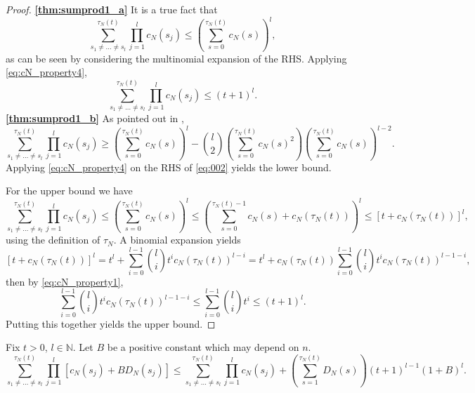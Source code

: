 \begin{proof} \textbf{\ref{thm:sumprod1_a}}
It is a true fact that
\begin{equation*}
\sum_{s_1\neq\dots\neq s_l}^{\tau_N(t)} \prod_{j=1}^l c_N(s_j)
\leq \left( \sum_{s=0}^{\tau_N(t)} c_N(s) \right)^l ,
\end{equation*}
as can be seen by considering the multinomial expansion of the RHS.
Applying \eqref{eq:cN_property4},
\begin{equation}\label{eq:039}
\sum_{s_1\neq\dots\neq s_l}^{\tau_N(t)} \prod_{j=1}^l c_N(s_j)
\leq (t+1)^l .
\end{equation}
\textbf{\ref{thm:sumprod1_b}}
As pointed out in \textcite[Equation (8)]{koskela2018}, 
\begin{equation}\label{eq:002}
\sum_{s_1\neq\dots\neq s_l}^{\tau_N(t)} \prod_{j=1}^l c_N(s_j)
\geq \left( \sum_{s=0}^{\tau_N(t)} c_N(s) \right)^l
        - \binom{l}{2} \left( \sum_{s=0}^{\tau_N(t)} c_N(s)^2 \right)
        \left( \sum_{s=0}^{\tau_N(t)} c_N(s) \right)^{l-2} .
\end{equation}
Applying \eqref{eq:cN_property4} on the RHS of \eqref{eq:002} yields the lower bound.

For the upper bound we have
\begin{equation*}
\sum_{s_1\neq\dots\neq s_l}^{\tau_N(t)} \prod_{j=1}^l c_N(s_j)
\leq \left( \sum_{s=0}^{\tau_N(t)} c_N(s) \right)^l
\leq \left( \sum_{s=0}^{\tau_N(t) -1} c_N(s) + c_N(\tau_N(t)) \right)^l
\leq \left[ t + c_N(\tau_N(t)) \right]^l ,
\end{equation*}
using the definition of $\tau_N$.
A binomial expansion yields
\begin{equation*}
\left[ t + c_N(\tau_N(t)) \right]^l
= t^l + \sum_{i=0}^{l-1} \binom{l}{i} t^i c_N(\tau_N(t))^{l-i}
= t^l + c_N(\tau_N(t)) \sum_{i=0}^{l-1} \binom{l}{i} t^i c_N(\tau_N(t))^{l-1-i} ,
\end{equation*}
then by \eqref{eq:cN_property1},
\begin{equation*}
\sum_{i=0}^{l-1} \binom{l}{i} t^i c_N(\tau_N(t))^{l-1-i}
\leq \sum_{i=0}^{l-1} \binom{l}{i} t^i
\leq (t+1)^l .
\end{equation*}
Putting this together yields the upper bound.
\end{proof}


\begin{lemma}\label{thm:sumprod2}
Fix $t>0$, $l\in\mathbb{N}$.
Let $B$ be a positive constant which may depend on $n$.
\begin{equation*}
\sum_{s_1\neq\dots\neq s_l}^{\tau_N(t)} \prod_{j=1}^l 
        \left[ c_N(s_j) + B D_N(s_j) \right]
\leq \sum_{s_1\neq\dots\neq s_l}^{\tau_N(t)} \prod_{j=1}^l c_N(s_j)
        + \left( \sum_{s=1}^{\tau_N(t)} D_N(s) \right) (t+1)^{l-1} (1+B)^l .
\end{equation*}
\end{lemma}

